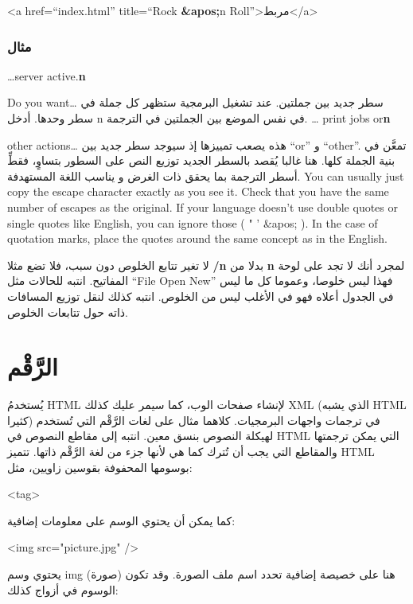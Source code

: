 <a href=“index.html” title=“Rock {\bf \&apos;}n Roll”>مربط</a>\NC\AR
\HL
\stoptable
\subsubsection{مثال}
\starttable[|l|l|l|]
\HL
\NC {} \NC {} \NC
{}\NC\AR
\HL
\NC …server active.{\bf {} n}

Do you want…  \NC سطر جديد بين جملتين. عند تشغيل البرمجية ستظهر كل جملة
في سطر وحدها. \NC أدخل ‪ n‬ في نفس الموضع بين الجملتين
في الترجمة.\NC\AR
\HL
\NC … print jobs or{\bf {} n}

other actions…  \NC هذه يصعب تمييزها إذ سيوجد سطر جديد بين “or” و
“other”. \NC تمعَّن في بنية الجملة كلها. هنا غالبا يُقصد بالسطر الجديد
توزيع النص على السطور بتساوٍ، فقطِّ أسطر الترجمة بما يحقق ذات الغرض و
يناسب اللغة المستهدفة.\NC\AR
\HL
\stoptable
You can usually just copy the escape character exactly as you see it.
Check that you have the same number of escapes as the original. If your
language doesn’t use double quotes or single quotes like English, you
can ignore those (  "   '  \&apos; ).
In the case of quotation marks, place the quotes around the same
concept as in the English.

لا تغير تتابع الخلوص دون سبب، فلا تضع مثلا {\bf ‪/n‬} بدلا من {\bf
‪ n‬} لمجرد أنك لا تجد   على لوحة
المفاتيح. انتبه للحالات مثل “File   Open
  New” فهذا ليس خلوصا، وعموما كل ما ليس في الجدول أعلاه
فهو في الأغلب ليس من الخلوص. انتبه كذلك لنقل توزيع المسافات ذاته حول
تتابعات الخلوص.

\section{الرَّقْم}
يُستخدمُ HTML لإنشاء صفحات الوب، كما سيمر عليك كذلك XML (الذي يشبه HTML
كثيرا) في ترجمات واجهات البرمجيات. كلاهما مثال على لغات الرَّقْم التي
تُستخدم لهيكلة النصوص بنسق معين. انتبه إلى مقاطع النصوص في HTML التي
يمكن ترجمتها والمقاطع التي يجب أن تُترك كما هي لأنها جزء من لغة
الرَّقْم ذاتها. تتميز HTML بوسومها المحفوفة بقوسين زاويين، مثل:

<tag>

كما يمكن أن يحتوي الوسم على معلومات إضافية:

<img src="picture.jpg" />

يحتوي وسم img (صورة) هنا على خصيصة إضافية تحدد اسم ملف الصورة. وقد تكون
الوسوم في أزواج كذلك:

